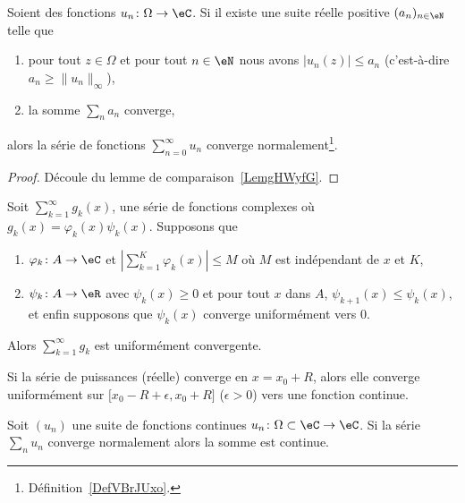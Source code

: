 \begin{lemma}
    Soient des fonctions \( u_n\colon \Omega\to \eC\). Si il existe une suite réelle positive \( (a_n)_{n\in \eN}\) telle que
    \begin{enumerate}
        \item
            pour tout \( z\in \Omega\) et pour tout \( n\in \eN\) nous avons \( | u_n(z) |\leq a_n\) (c'est-à-dire \( a_n\geq \| u_n \|_{\infty}\)),
        \item
            la somme \( \sum_{n}a_n\) converge,
    \end{enumerate}
    alors la série de fonctions \( \sum_{n=0}^{\infty}u_n\) converge normalement\footnote{Définition~\ref{DefVBrJUxo}.}.
\end{lemma}

\begin{proof}
    Découle du lemme de comparaison~\ref{LemgHWyfG}.
\end{proof}

\begin{theorem}				\label{ThoSerCritAbel}
	Soit $\sum_{k=1}^{\infty}g_k(x)$, une série de fonctions complexes où $g_k(x)=\varphi_k(x)\psi_k(x)$. Supposons que
	\begin{enumerate}

		\item
			$\varphi_k\colon A\to \eC$ et $| \sum_{k=1}^K\varphi_k(x) |\leq M$ où $M$ est indépendant de $x$ et $K$,
		\item
			$\psi_k\colon A\to \eR$ avec $\psi_k(x)\geq 0$ et pour tout $x$ dans $A$, $\psi_{k+1}(x)\leq \psi_k(x)$, et enfin supposons que $\psi_k(x)$ converge uniformément vers $0$.

	\end{enumerate}
	Alors $\sum_{k=1}^{\infty}g_k$ est uniformément convergente.
\end{theorem}

\begin{theorem}		\label{ThoAbelSeriePuiss}
	Si la série de puissances (réelle) converge en $x=x_0+R$, alors elle converge uniformément sur $\mathopen[ x_0-R+\epsilon , x_0+R \mathclose]$ ($\epsilon>0$) vers une fonction continue.
\end{theorem}


\begin{proposition}     \label{PropUEMoNF}
    Soit \( (u_n)\) une suite de fonctions continues \( u_n\colon \Omega\subset\eC\to \eC\). Si la série \( \sum_nu_n\) converge normalement alors la somme est continue.
\end{proposition}

